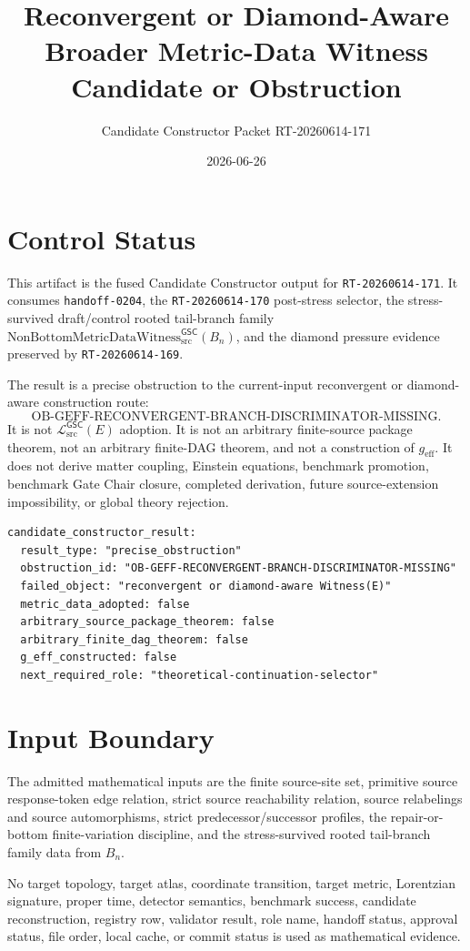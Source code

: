 \documentclass[11pt]{article}
\title{Reconvergent or Diamond-Aware Broader Metric-Data Witness Candidate or Obstruction}
\author{Candidate Constructor Packet RT-20260614-171}
\date{2026-06-26}
\newcommand{\Witness}{\mathrm{NonBottomMetricDataWitness}_{\mathrm{src}}^{\mathsf{GSC}}}
\newcommand{\MetricData}{\mathcal{L}_{\mathrm{src}}^{\mathsf{GSC}}}
\newcommand{\geff}{g_{\mathrm{eff}}}
\newcommand{\Bn}{B_n}
\begin{document}
\maketitle

\section{Control Status}

This artifact is the fused Candidate Constructor output for
\texttt{RT-20260614-171}. It consumes \texttt{handoff-0204}, the
\texttt{RT-20260614-170} post-stress selector, the stress-survived
draft/control rooted tail-branch family \(\Witness(\Bn)\), and the diamond
pressure evidence preserved by \texttt{RT-20260614-169}.

The result is a precise obstruction to the current-input reconvergent or
diamond-aware construction route:
\[
\mathrm{OB\mbox{-}GEFF\mbox{-}RECONVERGENT\mbox{-}BRANCH\mbox{-}DISCRIMINATOR\mbox{-}MISSING}.
\]
It is not \(\MetricData(E)\) adoption. It is not an arbitrary finite-source
package theorem, not an arbitrary finite-DAG theorem, and not a construction
of \(\geff\). It does not derive matter coupling, Einstein equations,
benchmark promotion, benchmark Gate Chair closure, completed derivation,
future source-extension impossibility, or global theory rejection.

\begin{verbatim}
candidate_constructor_result:
  result_type: "precise_obstruction"
  obstruction_id: "OB-GEFF-RECONVERGENT-BRANCH-DISCRIMINATOR-MISSING"
  failed_object: "reconvergent or diamond-aware Witness(E)"
  metric_data_adopted: false
  arbitrary_source_package_theorem: false
  arbitrary_finite_dag_theorem: false
  g_eff_constructed: false
  next_required_role: "theoretical-continuation-selector"
\end{verbatim}

\section{Input Boundary}

The admitted mathematical inputs are the finite source-site set, primitive
source response-token edge relation, strict source reachability relation,
source relabelings and source automorphisms, strict predecessor/successor
profiles, the repair-or-bottom finite-variation discipline, and the
stress-survived rooted tail-branch family data from \(\Bn\).

No target topology, target atlas, coordinate transition, target metric,
Lorentzian signature, proper time, detector semantics, benchmark success,
candidate reconstruction, registry row, validator result, role name, handoff
status, approval status, file order, local cache, or commit status is used as
mathematical evidence.
\end{document}
